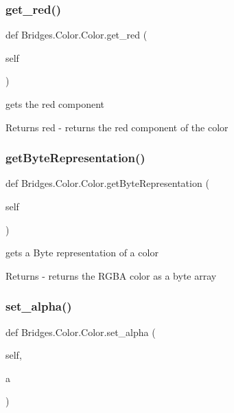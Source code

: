 \subsubsection{\texorpdfstring{get\+\_\+red()}{get\_red()}}
{\footnotesize\ttfamily def Bridges.\+Color.\+Color.\+get\+\_\+red (\begin{DoxyParamCaption}\item[{}]{self }\end{DoxyParamCaption})}



gets the red component 

\begin{DoxyReturn}{Returns}
red -\/ returns the red component of the color 
\end{DoxyReturn}
\mbox{\label{class_bridges_1_1_color_1_1_color_a13edd205c32eb199664b87f0145f50fe}} 
\subsubsection{\texorpdfstring{get\+Byte\+Representation()}{getByteRepresentation()}}
{\footnotesize\ttfamily def Bridges.\+Color.\+Color.\+get\+Byte\+Representation (\begin{DoxyParamCaption}\item[{}]{self }\end{DoxyParamCaption})}



gets a Byte representation of a color 

\begin{DoxyReturn}{Returns}
-\/ returns the R\+G\+BA color as a byte array 
\end{DoxyReturn}
\mbox{\label{class_bridges_1_1_color_1_1_color_a3dbced3824a73df14c8bf810d445238e}} 
\subsubsection{\texorpdfstring{set\+\_\+alpha()}{set\_alpha()}}
{\footnotesize\ttfamily def Bridges.\+Color.\+Color.\+set\+\_\+alpha (\begin{DoxyParamCaption}\item[{}]{self,  }\item[{}]{a }\end{DoxyParamCaption})}



